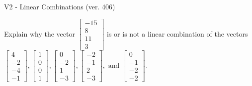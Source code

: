 \begin{exercise}
  \begin{exerciseTitle}V2 - Linear Combinations (ver. 406)\end{exerciseTitle}
  \begin{exerciseStatement}
    Explain why the vector \(\left[\begin{array}{c}
-15 \\
8 \\
11 \\
3
\end{array}\right]\)  is or is not a linear 
	combination of the vectors \(\left[\begin{array}{c}
4 \\
-2 \\
-4 \\
-1
\end{array}\right] , \left[\begin{array}{c}
1 \\
0 \\
0 \\
1
\end{array}\right] , \left[\begin{array}{c}
0 \\
-2 \\
1 \\
-3
\end{array}\right] , \left[\begin{array}{c}
-2 \\
-1 \\
2 \\
-3
\end{array}\right] , \text{ and } \left[\begin{array}{c}
0 \\
-1 \\
-2 \\
-2
\end{array}\right]\).
	



\end{exerciseStatement}
\end{exercise}
